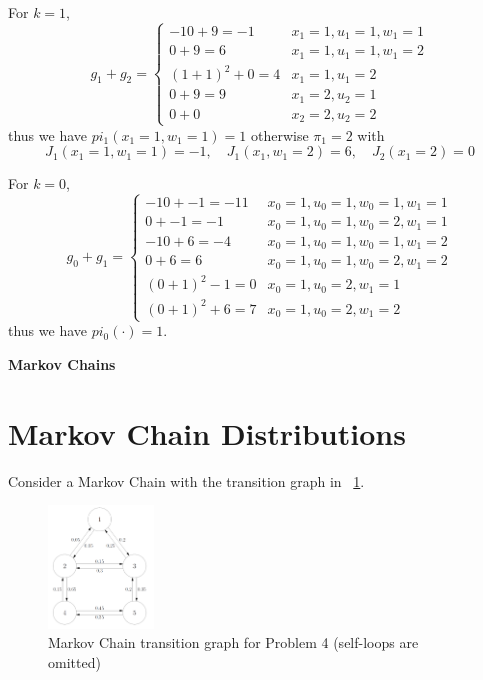 \documentclass[]{article}
\begin{document}
For $k=1$, \[
    g_1 + g_2= \begin{cases}
        -10 + 9 = -1 &x_1=1, u_1 = 1, w_1 = 1\\
        0 + 9 = 6 &x_1=1, u_1 = 1, w_1 = 2\\
        (1+1)^2 + 0 = 4 &x_1 = 1, u_1 = 2\\
        0 + 9 = 9 &x_1 = 2, u_2 = 1\\
        0 + 0 &x_2 =2, u_2 = 2
    \end{cases}
\] thus we have $pi_1(x_1=1,w_1=1) = 1$ otherwise $\pi_1 = 2$ with \[
    J_1(x_1 = 1, w_1 = 1) = -1, \quad J_1(x_1, w_1=2) = 6, \quad J_2(x_1 = 2) = 0
\]

For $k=0$, \[
    g_0 + g_1 = \begin{cases}
        -10 + -1 = -11 &x_0=1, u_0 = 1, w_0 = 1, w_1 = 1\\
        0 + -1 = -1 &x_0=1, u_0 = 1, w_0 = 2, w_1 = 1\\
        -10 + 6 = -4 &x_0=1, u_0 = 1, w_0 = 1, w_1 = 2\\
        0 + 6 = 6 &x_0=1, u_0 = 1, w_0 = 2, w_1 = 2\\
        (0+1)^2 -1 = 0 &x_0=1, u_0 = 2, w_1 = 1\\
        (0+1)^2 + 6 = 7 &x_0=1, u_0 = 2, w_1 = 2
    \end{cases}
\] thus we have $pi_0(\cdot) = 1$.


\newpage
\textbf{Markov Chains}
\section{Markov Chain Distributions}
Consider a Markov Chain with the transition graph in \figurename \ \ref{fig:pblm4_markovchain}.

\begin{figure}[h]
    \centering
    \includegraphics[width=0.25\textwidth]{figs/pblm4_markovchain.png}
    \caption{Markov Chain transition graph for Problem 4 (self-loops are omitted)}
    \label{fig:pblm4_markovchain}
\end{figure}
\end{document}
